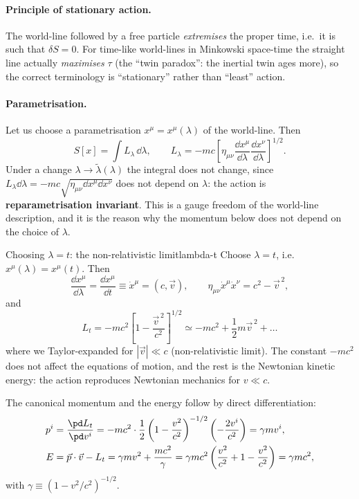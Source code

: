 \paragraph{Principle of stationary action.} The world-line followed by a free particle \emph{extremises} the proper time, i.e.\ it is such that $\delta S=0$. For time-like world-lines in Minkowski space-time the straight line actually \emph{maximises} $\tau$ (the ``twin paradox'': the inertial twin ages more), so the correct terminology is ``stationary'' rather than ``least'' action.

\paragraph{Parametrisation.} Let us choose a parametrisation $x^\mu=x^\mu(\lambda)$ of the world-line. Then
\begin{equation}
  S[x]=\int L_\lambda\,\dd\lambda,\qquad L_\lambda=-mc\left[\eta_{\mu\nu}\frac{\dd x^\mu}{\dd\lambda}\frac{\dd x^\nu}{\dd\lambda}\right]^{1/2}.
\end{equation}
Under a change $\lambda\to\tilde\lambda(\lambda)$ the integral does not change, since $L_\lambda\dd\lambda=-mc\sqrt{\eta_{\mu\nu}\dd x^\mu\dd x^\nu}$ does not depend on $\lambda$: the action is \textbf{reparametrisation invariant}. This is a gauge freedom of the world-line description, and it is the reason why the momentum below does not depend on the choice of $\lambda$.

\begin{example}{Choosing $\lambda=t$: the non-relativistic limit}{lambda-t}
Choose $\lambda=t$, i.e.\ $x^\mu(\lambda)=x^\mu(t)$. Then
\[
  \frac{\dd x^\mu}{\dd\lambda}=\frac{\dd x^\mu}{\dd t}\equiv\dot x^\mu=(c,\vec v),\qquad
  \eta_{\mu\nu}\dot x^\mu\dot x^\nu=c^2-\vec v^{\,2},
\]
and
\[
  L_t=-mc^2\left[1-\frac{\vec v^{\,2}}{c^2}\right]^{1/2}\simeq -mc^2+\frac12 m\vec v^{\,2}+\dots
\]
where we Taylor-expanded for $|\vec v|\ll c$ (non-relativistic limit). The constant $-mc^2$ does not affect the equations of motion, and the rest is the Newtonian kinetic energy: the action reproduces Newtonian mechanics for $v\ll c$.

The canonical momentum and the energy follow by direct differentiation:
\begin{align}
  p^i&=\frac{\pd L_t}{\pd v^i}=-mc^2\cdot\frac12\left(1-\frac{v^2}{c^2}\right)^{-1/2}\left(-\frac{2v^i}{c^2}\right)=\gamma m v^i,\\
  E&=\vec p\cdot\vec v-L_t=\gamma m v^2+\frac{mc^2}{\gamma}=\gamma mc^2\left(\frac{v^2}{c^2}+1-\frac{v^2}{c^2}\right)=\gamma mc^2,
\end{align}
with $\gamma\equiv(1-v^2/c^2)^{-1/2}$.
\end{example}

